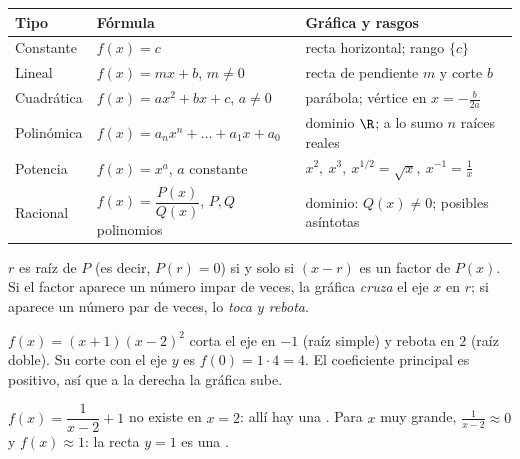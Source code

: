 \documentclass[11pt,a4paper]{article}
\begin{document}
\begin{center}
\begin{tabularx}{\linewidth}{@{}l l L@{}}
\toprule
Tipo & Fórmula & Gráfica y rasgos\\ \midrule
Constante & $f(x)=c$ & recta horizontal; rango $\{c\}$\\
Lineal & $f(x)=mx+b$, $m\ne 0$ & recta de pendiente $m$ y corte $b$\\
Cuadrática & $f(x)=ax^2+bx+c$, $a\ne0$ & parábola; vértice en $x=-\frac{b}{2a}$\\
Polinómica & $f(x)=a_nx^n+\dots+a_1x+a_0$ & dominio $\R$; a lo sumo $n$ raíces reales\\
Potencia & $f(x)=x^{a}$, $a$ constante & $x^2,\ x^3,\ x^{1/2}=\sqrt{x},\ x^{-1}=\frac1x$\\
Racional & $f(x)=\dfrac{P(x)}{Q(x)}$, $P,Q$ polinomios & dominio: $Q(x)\ne0$; posibles asíntotas\\
\bottomrule
\end{tabularx}
\end{center}

\begin{propiedad}
$r$ es raíz de $P$ (es decir, $P(r)=0$) si y solo si $(x-r)$ es un factor de $P(x)$. Si el factor aparece un número
impar de veces, la gráfica \emph{cruza} el eje $x$ en $r$; si aparece un número par de veces, lo \emph{toca y rebota}.
\end{propiedad}

\begin{minipage}[t]{0.48\linewidth}
\begin{ejemplo}
$f(x)=(x+1)(x-2)^2$ corta el eje en $-1$ (raíz simple) y rebota en $2$ (raíz doble). Su corte con el eje $y$ es
$f(0)=1\cdot4=4$. El coeficiente principal es positivo, así que a la derecha la gráfica sube.
\end{ejemplo}
\end{minipage}\hfill
\begin{minipage}[t]{0.48\linewidth}
\begin{ejemplo}
$f(x)=\dfrac{1}{x-2}+1$ no existe en $x=2$: allí hay una . Para $x$ muy grande,
$\frac{1}{x-2}\approx0$ y $f(x)\approx1$: la recta $y=1$ es una .
\end{ejemplo}
\end{minipage}
\end{document}
